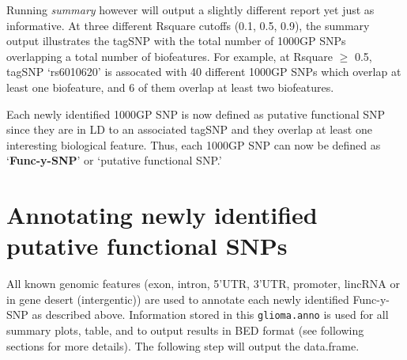 \documentclass[12pt,fullpage]{article}
\newcommand{\Robject}[1]{{\texttt{#1}}}
\newcommand{\Rmethod}[1]{{\textit{#1}}}
\begin{document}
Running \Rmethod{summary} however will output a slightly different report yet
just as informative. At three different Rsquare cutoffs (0.1, 0.5, 0.9), the
summary output illustrates the tagSNP with the total number of 1000GP SNPs
overlapping a total number of biofeatures. For example, at Rsquare $\ge$ 0.5,
tagSNP `rs6010620' is assocated with 40 different 1000GP SNPs which overlap at
least one biofeature, and 6 of them overlap at least two biofeatures.

Each newly identified 1000GP SNP is now defined as putative functional SNP since
they are in LD to an associated tagSNP and they overlap at least one interesting
biological feature. Thus, each 1000GP SNP can now be defined as
`\textbf{Func-y-SNP}' or `putative functional SNP.'

\section{Annotating newly identified putative functional SNPs}

All known genomic features (exon, intron, 5'UTR, 3'UTR, promoter, lincRNA or in
gene desert (intergentic)) are used to annotate each newly identified Func-y-SNP
as described above. Information stored in this \Robject{glioma.anno} is used for
all summary plots, table, and to output results in BED format (see following
sections for more details). The following step will output the data.frame.
\end{document}

